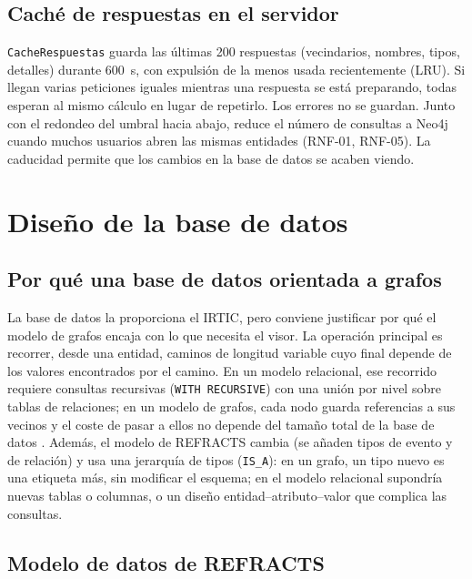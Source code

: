 \subsection{Caché de respuestas en el servidor}
\label{sec:alg-cache}

\texttt{CacheRespuestas} guarda las últimas 200 respuestas (vecindarios, nombres, tipos, detalles) durante 600~s, con expulsión de la menos usada recientemente (LRU). Si llegan varias peticiones iguales mientras una respuesta se está preparando, todas esperan al mismo cálculo en lugar de repetirlo. Los errores no se guardan. Junto con el redondeo del umbral hacia abajo, reduce el número de consultas a Neo4j cuando muchos usuarios abren las mismas entidades (RNF-01, RNF-05). La caducidad permite que los cambios en la base de datos se acaben viendo.

\section{Diseño de la base de datos}
\label{sec:bd}

\subsection{Por qué una base de datos orientada a grafos}

La base de datos la proporciona el IRTIC, pero conviene justificar por qué el modelo de grafos encaja con lo que necesita el visor. La operación principal es recorrer, desde una entidad, caminos de longitud variable cuyo final depende de los valores encontrados por el camino. En un modelo relacional, ese recorrido requiere consultas recursivas (\texttt{WITH RECURSIVE}) con una unión por nivel sobre tablas de relaciones; en un modelo de grafos, cada nodo guarda referencias a sus vecinos y el coste de pasar a ellos no depende del tamaño total de la base de datos \cite{TODO}. Además, el modelo de REFRACTS cambia (se añaden tipos de evento y de relación) y usa una jerarquía de tipos (\texttt{IS\_A}): en un grafo, un tipo nuevo es una etiqueta más, sin modificar el esquema; en el modelo relacional supondría nuevas tablas o columnas, o un diseño entidad--atributo--valor que complica las consultas.

\subsection{Modelo de datos de REFRACTS}

